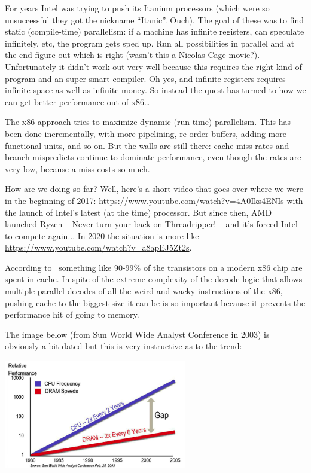 \documentclass[a4paper]{report}
\begin{document}
For years Intel was trying to push its Itanium processors (which were so unsuccessful they got the nickname ``Itanic''. Ouch). The goal of these was to find static (compile-time) parallelism: if a machine has infinite registers, can speculate infinitely, etc, the program gets sped up. Run all possibilities in parallel and at the end figure out which is right (wasn't this a Nicolas Cage movie?). Unfortunately it didn't work out very well because this requires the right kind of program and an super smart compiler. Oh yes, and infinite registers requires infinite space as well as infinite money. So instead the quest has turned to how we can get better performance out of x86\ldots

The x86 approach tries to maximize dynamic (run-time) parallelism. This has been done incrementally, with more pipelining, re-order buffers, adding more functional units, and so on. But the walls are still there: cache miss rates and branch mispredicts continue to dominate performance, even though the rates are very low, because a miss costs so much. 

How are we doing so far? Well, here's a short video that goes over where we were in the beginning of 2017: \url{https://www.youtube.com/watch?v=4A0Iks4ENIs} with the launch of Intel's latest (at the time) processor. But since then, AMD launched Ryzen -- Never turn your back on Threadripper! -- and it's forced Intel to compete again... In 2020 the situation is more like \url{https://www.youtube.com/watch?v=a8apEJ5Zt2s}.

According to~\cite{modern-hardware} something like 90-99\% of the transistors on a modern x86 chip are spent in cache. In spite of the extreme complexity of the decode logic that allows multiple parallel decodes of all the weird and wacky instructions of the x86, pushing cache to the biggest size it can be is so important because it prevents the performance hit of going to memory.

The image below (from Sun World Wide Analyst Conference in 2003) is obviously a bit dated but this is very instructive as to the trend:
\begin{center}
\includegraphics[width=0.6\textwidth]{images/ram-vs-cpu.png}
\end{center}
\end{document}
